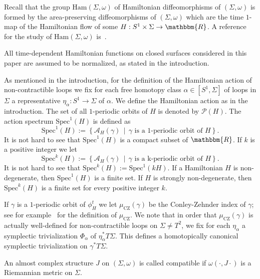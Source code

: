 \documentclass[AHL,Unicode,longabstracts,published]{cedram}
\newcommand{\R}{\mathbbm{R}}
\newcommand{\Ham}{\mathrm{Ham}}
\newcommand{\Spec}{\mathrm{Spec}}
\newcommand{\rCZ}{\mathrm{CZ}}
\newcommand{\clP}{\mathcal{P}}
\newcommand{\clA}{\mathcal{A}}
\begin{document}
Recall that the group $\Ham(\Sigma,\omega)$ of Hamiltonian diffeomorphisms of $(\Sigma,\omega)$ is formed by the area-preserving diffeomorphisms of $(\Sigma,\omega)$ which are the time $1$-map of the Hamiltonian flow of some $H: S^1 \times \Sigma \to \R$. A reference for the study of $\Ham(\Sigma,\omega)$ is~\cite{leonidsbook}.



All time-dependent Hamiltonian functions on closed surfaces considered in this paper are assumed to be normalized, as stated in the introduction.



As mentioned in the introduction, for the definition of the Hamiltonian action of non-contractible loops we fix for each free homotopy class $\alpha \in [S^1, \Sigma]$ of loops in $\Sigma$ a representative $\eta_{\alpha}:S^1 \to \Sigma$ of $\alpha$. We define the Hamiltonian action as in the introduction. The set of all $1$-periodic orbits of $H$ is denoted by $\clP(H)$. The action spectrum $\Spec^1(H)$ is defined as
\begin{equation}
\Spec^1(H):= \left\{ \clA_H(\gamma) \, \middle| \, \gamma \text{ is a } \text{1-periodic orbit of } H \right\}.
\end{equation}
It is not hard to see that $\Spec^1(H)$ is a compact subset of $\R$. If $k$ is a positive integer we let
\begin{equation}
\Spec^k(H):=  \left\{ \clA_H(\gamma) \,\middle|\, \gamma \text{ is a } \text{k-periodic orbit of } H \right\}.
\end{equation}
It is not hard to see that $\Spec^k(H):= \Spec^1(kH)$. If a Hamiltonian $H$ is non-degenerate, then $\Spec^1(H)$ is a finite set. If $H$ is strongly non-degenerate, then $\Spec^k(H)$ is a finite set for every positive integer $k$.

If $\gamma$ is a $1$-periodic orbit of $\phi^t_H$ we let $\mu_{\rCZ}(\gamma)$ be the Conley-Zehnder index of $\gamma$; see for example~\cite{AD} for the definition of $\mu_{\rCZ}$. We note that in order that $\mu_{\rCZ}(\gamma)$ is actually well-defined for non-contractible loops on $\Sigma \neq T^2$, we fix for each $\eta_{\alpha}$ a symplectic trivialization $\Phi_{\alpha}$ of $\eta_{\alpha}^*T\Sigma$. This defines a homotopically canonical symplectic trivialization on $\gamma^*T\Sigma$.

An almost complex structure $J$ on $(\Sigma, \omega)$ is called compatible if $\omega(\cdot,J\cdot)$ is a Riemannian metric on $\Sigma$.
\end{document}
